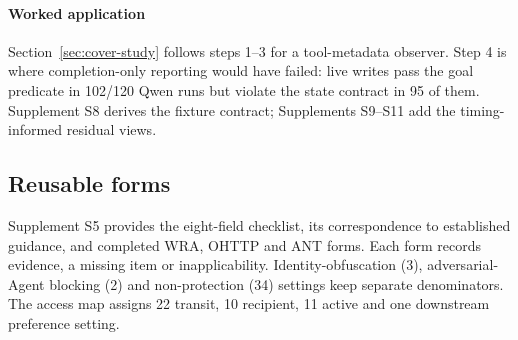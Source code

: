 \paragraph{Worked application}
Section~\ref{sec:cover-study} follows steps 1--3 for a tool-metadata observer. Step 4 is where completion-only reporting would have failed: live writes pass the goal predicate in 102/120 Qwen runs but violate the state contract in 95 of them. Supplement S8 derives the fixture contract; Supplements S9--S11 add the timing-informed residual views.

\subsection{Reusable forms}
Supplement S5 provides the eight-field checklist, its correspondence to established guidance, and completed WRA, OHTTP and ANT forms. Each form records evidence, a missing item or inapplicability. Identity-obfuscation (3), adversarial-Agent blocking (2) and non-protection (34) settings keep separate denominators. The access map assigns 22 transit, 10 recipient, 11 active and one downstream preference setting.
